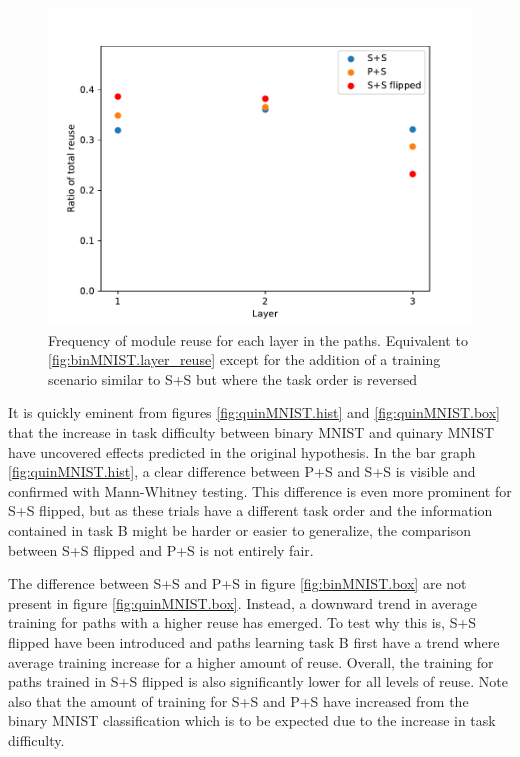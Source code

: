 \begin{figure}[t]
    \includegraphics[width=\textwidth]{Chapters/4.Experiments/exp1/figures/QUIN_reuse_by_layer.pdf}
    \caption[Reuse by layer for quinary MNIST classification]{Frequency of module reuse for each layer in the paths. Equivalent to \ref{fig:binMNIST.layer_reuse} except for the addition of a training scenario similar to S+S but where the task order is reversed}
    \label{fig:quinMNIST.layer_reuse}
\end{figure}

It is quickly eminent from figures \ref{fig:quinMNIST.hist} and \ref{fig:quinMNIST.box} that the increase in task difficulty between binary MNIST and quinary MNIST have uncovered effects predicted in the original hypothesis. In the bar graph \ref{fig:quinMNIST.hist}, a clear difference between P+S and S+S is visible and confirmed with Mann-Whitney testing. This difference is even more prominent for S+S flipped, but as these trials have a different task order and the information contained in task B might be harder or easier to generalize, the comparison between S+S flipped and P+S is not entirely fair. 

The difference between S+S and P+S in figure \ref{fig:binMNIST.box} are not present in figure \ref{fig:quinMNIST.box}. Instead, a downward trend in average training for paths with a higher reuse has emerged. To test why this is, S+S flipped have been introduced and paths learning task B first have a trend where average training increase for a higher amount of reuse. Overall, the training for paths trained in S+S flipped is also significantly lower for all levels of reuse. Note also that the amount of training for S+S and P+S have increased from the binary MNIST classification which is to be expected due to the increase in task difficulty. 

